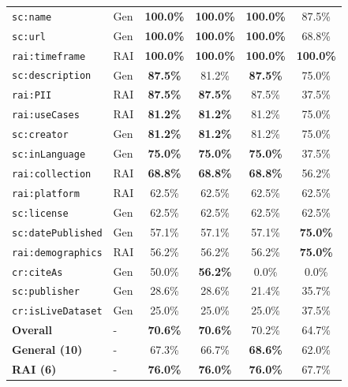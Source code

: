 \documentclass[11pt,a4paper]{article}
\begin{document}
\begin{longtable}{llcccc}
\texttt{sc:name} & Gen & \textbf{100.0\%} & \textbf{100.0\%} & \textbf{100.0\%} & 87.5\% \\
\texttt{sc:url} & Gen & \textbf{100.0\%} & \textbf{100.0\%} & \textbf{100.0\%} & 68.8\% \\
\texttt{rai:timeframe} & RAI & \textbf{100.0\%} & \textbf{100.0\%} & \textbf{100.0\%} & \textbf{100.0\%} \\
\texttt{sc:description} & Gen & \textbf{87.5\%} & 81.2\% & \textbf{87.5\%} & 75.0\% \\
\texttt{rai:PII} & RAI & \textbf{87.5\%} & \textbf{87.5\%} & 87.5\% & 37.5\% \\
\texttt{rai:useCases} & RAI & \textbf{81.2\%} & \textbf{81.2\%} & 81.2\% & 75.0\% \\
\texttt{sc:creator} & Gen & \textbf{81.2\%} & \textbf{81.2\%} & 81.2\% & 75.0\% \\
\texttt{sc:inLanguage} & Gen & \textbf{75.0\%} & \textbf{75.0\%} & \textbf{75.0\%} & 37.5\% \\
\texttt{rai:collection} & RAI & \textbf{68.8\%} & \textbf{68.8\%} & \textbf{68.8\%} & 56.2\% \\
\texttt{rai:platform} & RAI & 62.5\% & 62.5\% & 62.5\% & 62.5\% \\
\texttt{sc:license} & Gen & 62.5\% & 62.5\% & 62.5\% & 62.5\% \\
\texttt{sc:datePublished} & Gen & 57.1\% & 57.1\% & 57.1\% & \textbf{75.0\%} \\
\texttt{rai:demographics} & RAI & 56.2\% & 56.2\% & 56.2\% & \textbf{75.0\%} \\
\texttt{cr:citeAs} & Gen & 50.0\% & \textbf{56.2\%} & \textcolor{errorred}{0.0\%} & \textcolor{errorred}{0.0\%} \\
\texttt{sc:publisher} & Gen & \textcolor{errorred}{28.6\%} & \textcolor{errorred}{28.6\%} & 21.4\% & 35.7\% \\
\texttt{cr:isLiveDataset} & Gen & \textcolor{errorred}{25.0\%} & \textcolor{errorred}{25.0\%} & \textcolor{errorred}{25.0\%} & 37.5\% \\
\midrule
\textbf{Overall} & - & \textbf{70.6\%} & \textbf{70.6\%} & 70.2\% & 64.7\% \\
\textbf{General (10)} & - & 67.3\% & 66.7\% & \textbf{68.6\%} & 62.0\% \\
\textbf{RAI (6)} & - & \textbf{76.0\%} & \textbf{76.0\%} & \textbf{76.0\%} & 67.7\% \\
\end{longtable}
\end{document}
